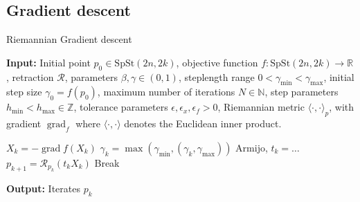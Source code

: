 \subsection{Gradient descent}






\begin{algorithm}[H]
    \caption{Riemannian Gradient descent}\label{alg:grad_descent}
    \textbf{Input:} Initial point $p_{0}\in \mathrm{SpSt}(2n, 2k)$, objective function $f\colon\mathrm{SpSt}(2n, 2k)\to \mathbb{R}$, retraction $\mathcal{R}$, parameters $\beta, \gamma \in(0,1)$, steplength range $0<\gamma_{\text{min}}<\gamma_{\text{max}}$, initial step size $\gamma_{0}=f(p_{0})$, maximum number of iterations $N\in \mathbb{N}$, step parameters $h_{\text{min}}<h_{\text{max}}\in \mathbb{Z}$, tolerance parameters $\epsilon, \epsilon_{x}, \epsilon_{f}>0$, Riemannian metric $\langle \cdot,\cdot \rangle_{p}$, with gradient $\operatorname*{grad}_{f}$ where $\langle \cdot,\cdot \rangle$ denotes the Euclidean inner product.
    \begin{algorithmic}[1]
        \State $X_{k}=-\operatorname{grad}f(X_{k})$
        \State $\gamma_{k}=\operatorname{max}(\gamma_{\text{min}},(\gamma_{k}, \gamma_{\text{max}}))$
        \State Armijo, $t_{k}=\dots$
        \State $p_{k+1}=\mathcal{R}_{p_{k}}(t_{k}X_{k})$
        \State Break
        \EndIf
        \EndIf
        \EndFor
    \end{algorithmic}
    \textbf{Output:} Iterates $p_{k}$
\end{algorithm}